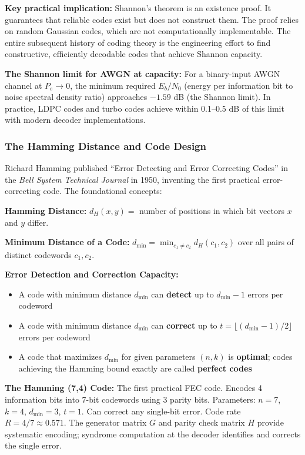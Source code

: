 \documentclass[11pt,letterpaper]{article}
\begin{document}
\textbf{Key practical implication:} Shannon's theorem is an existence proof. It guarantees that reliable codes exist but does not construct them. The proof relies on random Gaussian codes, which are not computationally implementable. The entire subsequent history of coding theory is the engineering effort to find constructive, efficiently decodable codes that achieve Shannon capacity.

\textbf{The Shannon limit for AWGN at capacity:} For a binary-input AWGN channel at $P_e \to 0$, the minimum required $E_b/N_0$ (energy per information bit to noise spectral density ratio) approaches $-1.59$ dB (the Shannon limit). In practice, LDPC codes and turbo codes achieve within 0.1--0.5 dB of this limit with modern decoder implementations.

\subsubsection{The Hamming Distance and Code Design}

Richard Hamming published ``Error Detecting and Error Correcting Codes'' in the \textit{Bell System Technical Journal} in 1950, inventing the first practical error-correcting code. The foundational concepts:

\textbf{Hamming Distance:} $d_H(x, y) = $ number of positions in which bit vectors $x$ and $y$ differ.

\textbf{Minimum Distance of a Code:} $d_{\min} = \min_{c_1 \neq c_2} d_H(c_1, c_2)$ over all pairs of distinct codewords $c_1, c_2$.

\textbf{Error Detection and Correction Capacity:}
\begin{itemize}[leftmargin=*]
  \item A code with minimum distance $d_{\min}$ can \textbf{detect} up to $d_{\min} - 1$ errors per codeword
  \item A code with minimum distance $d_{\min}$ can \textbf{correct} up to $t = \lfloor(d_{\min}-1)/2\rfloor$ errors per codeword
  \item A code that maximizes $d_{\min}$ for given parameters $(n, k)$ is \textbf{optimal}; codes achieving the Hamming bound exactly are called \textbf{perfect codes}
\end{itemize}

\textbf{The Hamming (7,4) Code:} The first practical FEC code. Encodes 4 information bits into 7-bit codewords using 3 parity bits. Parameters: $n=7$, $k=4$, $d_{\min}=3$, $t=1$. Can correct any single-bit error. Code rate $R = 4/7 \approx 0.571$. The generator matrix $G$ and parity check matrix $H$ provide systematic encoding; syndrome computation at the decoder identifies and corrects the single error.
\end{document}
